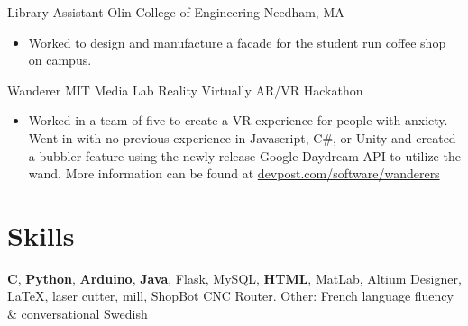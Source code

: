 \documentclass[11 pt]{moderncv}
\begin{document}
{Library Assistant}
{Olin College of Engineering}
{Needham, MA}
{}
{
\begin{itemize}
	\item Worked to design and manufacture a facade for the student run coffee shop on campus.
\end{itemize}
 }


{Wanderer}
{MIT Media Lab Reality Virtually AR/VR Hackathon}
{}
{}
{
\begin{itemize}
	\item Worked in a team of five to create a VR experience for people with anxiety. Went in with no previous experience in Javascript, C\#, or Unity and created a bubbler feature using the newly release Google Daydream API to utilize the wand. More information can be found at \href{https://devpost.com/software/wanderers}{devpost.com/software/wanderers}
\end{itemize}
}

\section{Skills}

\cvline{}
{
\textbf{C},
\textbf{Python},
\textbf{Arduino},
\textbf{Java},
Flask,
MySQL,
\textbf{HTML},
MatLab,
Altium Designer,
\LaTeX{},
laser cutter,
mill,
ShopBot CNC Router.
}
\cvline{}
{Other: French language fluency \& conversational Swedish}
\end{document}
